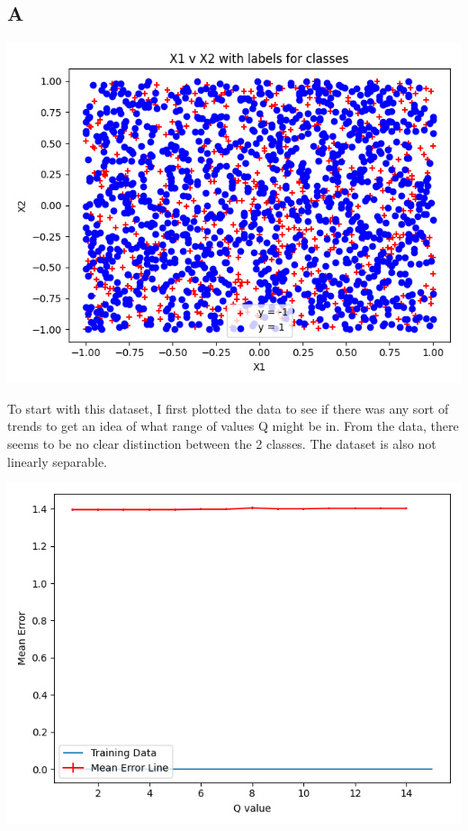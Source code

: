 \documentclass[11pt]{article} %
\begin{document}
\subsection{A}
\begin{center}
\includegraphics[scale=0.5]{xvx.png}
\end{center}
To start with this dataset, I first plotted the data to see if there was any sort of trends to get an idea of what range of values Q might be in. From the data, there seems to be no clear distinction between the 2 classes. The dataset is also not linearly separable.
\begin{center}
\includegraphics[scale=0.5]{j1.png}
\end{center}
\end{document}
